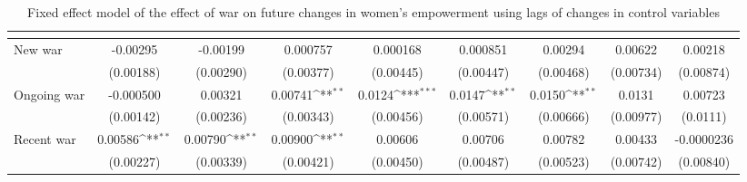 \begin{table}[htbp]\centering
\def\sym#1{\ifmmode^{#1}\else\(^{#1}\)\fi}
\caption{Fixed effect model of the effect of war on future changes in women's empowerment using lags of changes in control variables\label{polemprobustls}}
\begin{tabular}{l*{8}{c}}
\hline\hline
                    &&&&&&&&\\
\hline
New war             &    -0.00295         &    -0.00199         &    0.000757         &    0.000168         &    0.000851         &     0.00294         &     0.00622         &     0.00218         \\
                    &   (0.00188)         &   (0.00290)         &   (0.00377)         &   (0.00445)         &   (0.00447)         &   (0.00468)         &   (0.00734)         &   (0.00874)         \\
[1em]
Ongoing war         &   -0.000500         &     0.00321         &     0.00741\sym{**} &      0.0124\sym{***}&      0.0147\sym{**} &      0.0150\sym{**} &      0.0131         &     0.00723         \\
                    &   (0.00142)         &   (0.00236)         &   (0.00343)         &   (0.00456)         &   (0.00571)         &   (0.00666)         &   (0.00977)         &    (0.0111)         \\
[1em]
Recent war          &     0.00586\sym{**} &     0.00790\sym{**} &     0.00900\sym{**} &     0.00606         &     0.00706         &     0.00782         &     0.00433         &  -0.0000236         \\
                    &   (0.00227)         &   (0.00339)         &   (0.00421)         &   (0.00450)         &   (0.00487)         &   (0.00523)         &   (0.00742)         &   (0.00840)         \\

\end{tabular}
\end{table}
